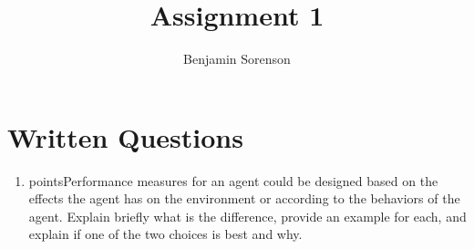 \documentclass[11pt]{article}  %
\begin{document}
\title{Assignment 1}
\author{Benjamin Sorenson}
\maketitle                     %

\section{Written Questions}
    \begin{enumerate}
    \item {} points\rbrack Performance measures for an agent could be
    designed based on the effects the agent has on the environment or
    according to the behaviors of the agent. Explain briefly what is the difference,
    provide an example for each, and explain if one of the two choices is best
    and why.

\end{enumerate}
\end{document}
